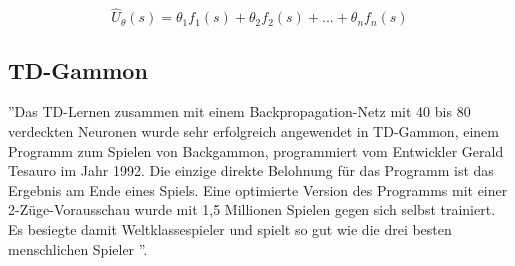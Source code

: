 \begin{equation*}
\hat{U}_\theta(s) = \theta_1 f_1(s) + \theta_2 f_2(s) + ... + \theta_n f_n(s)
\end{equation*}

\subsection{TD-Gammon}
\label{subsec:TD-Gammon}
''Das TD-Lernen zusammen mit einem Backpropagation-Netz mit 40 bis 80 verdeckten Neuronen wurde sehr erfolgreich angewendet in TD-Gammon, einem Programm zum Spielen von Backgammon, programmiert vom Entwickler Gerald Tesauro im Jahr 1992. Die einzige direkte Belohnung für das Programm ist das Ergebnis am Ende eines Spiels. Eine optimierte Version des Programms mit einer 2-Züge-Vorausschau wurde mit 1,5 Millionen Spielen gegen sich selbst trainiert. Es besiegte damit Weltklassespieler und spielt so gut wie die drei besten menschlichen Spieler \cite[304]{Ertel}''.  
